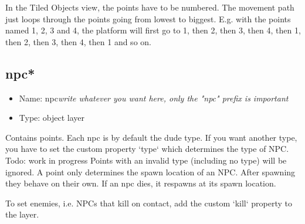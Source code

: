 \documentclass{article}
\begin{document}
In the Tiled Objects view, the points have to be numbered. The movement path just loops through the points going from lowest to biggest. E.g. with the points named 1, 2, 3 and 4, the platform will first go to 1, then 2, then 3, then 4, then 1, then 2, then 3, then 4, then 1 and so on.

\subsection{npc*}
\begin{itemize}
	\item Name: npc\textit{write whatever you want here, only the "npc" prefix is important}
	\item Type: object layer
\end{itemize}

Contains points. Each npc is by default the dude type. If you want another type, you have to set the custom property `type` which determines the type of NPC. Todo: work in progress
Points with an invalid type (including no type) will be ignored.
A point only determines the spawn location of an NPC. After spawning they behave on their own. If an npc dies, it respawns at its spawn location.

To set enemies, i.e. NPCs that kill on contact, add the custom `kill` property to the layer.
\end{document}
